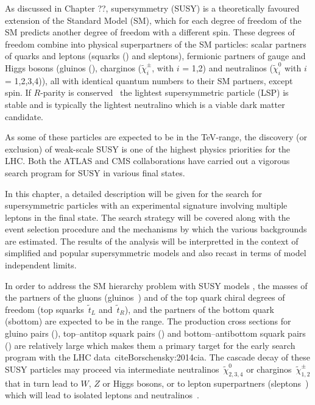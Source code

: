As discussed in Chapter ??, supersymmetry (SUSY) 
is a theoretically favoured extension of the Standard Model (SM),
which for each degree of freedom of the SM predicts another degree of
freedom with a different spin. These degrees of freedom combine into
physical superpartners of the SM particles: scalar partners of quarks
and leptons (squarks (\sq) and sleptons), fermionic
partners of gauge and Higgs bosons (gluinos (\gl), charginos
($\tilde{\chi}^{\pm}_{i}$, with $i$ = 1,2) and neutralinos
($\tilde{\chi}^{0}_{i}$ with $i$ = 1,2,3,4)), all with identical 
quantum numbers to their SM partners, except spin.
If $R$-parity is conserved~
the lightest supersymmetric particle (LSP) is stable 
and is typically the lightest neutralino \neut which is a viable 
dark matter candidate. 

As some of these particles are expected to be in the TeV-range, 
the discovery (or exclusion) of weak-scale SUSY is one of the highest
physics priorities for the LHC. Both the ATLAS and CMS collaborations 
have carried out a vigorous search program for SUSY in various final states.

In this chapter, a detailed description will be given for 
the search for supersymmetric particles with an experimental signature 
involving multiple leptons in the final state. The search strategy will 
be covered along with the event selection procedure and the mechanisms by which 
the various backgrounds are estimated. The results of the analysis 
will be interpretted in the context of simplified 
and popular supersymmetric models and also recast in terms of model independent 
limits. 


In order to address the SM hierarchy problem with SUSY models
, the masses of the partners of the gluons (gluinos~\gl) 
and of the top quark chiral degrees of freedom 
(top squarks~$\tilde t_L$ and~$\tilde t_R$), and the partners of the bottom 
quark (sbottom) are expected to be in the \TeV range.
The production cross sections 
for gluino pairs (\glgl), top--antitop squark pairs (\stst) 
and bottom--antibottom squark pairs (\sbsb) 
are relatively large which makes them a primary target for the early 
search program with the LHC data~cite{Borschensky:2014cia}.
The cascade decay of these SUSY particles may proceed
via intermediate neutralinos~$\tilde\chi^0_{2,3,4}$ or 
charginos~$\tilde\chi^\pm_{1,2}$ that in turn lead to $W$, $Z$ or Higgs bosons, 
or to lepton superpartners (sleptons~\slep) which will 
lead to isolated leptons and neutralinos~\neut.


